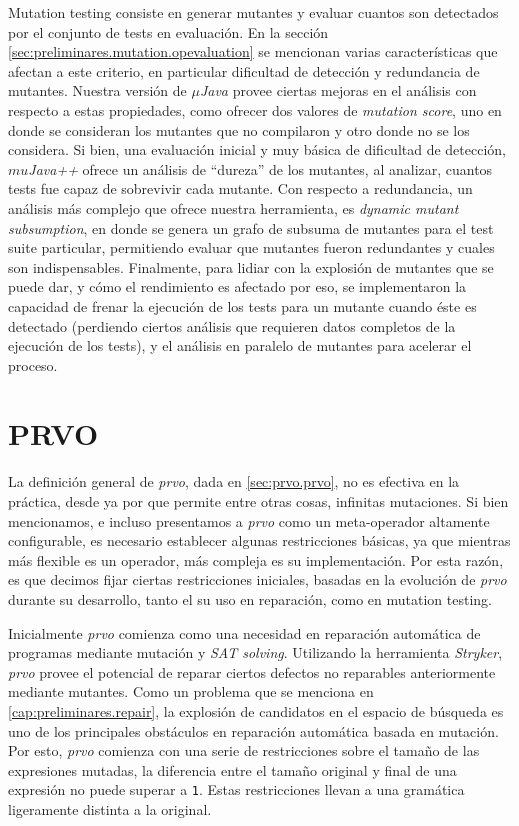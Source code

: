 Mutation testing consiste en generar mutantes y evaluar cuantos son detectados por el conjunto de tests en evaluaci\'on. En la secci\'on \ref{sec:preliminares.mutation.opevaluation} se mencionan varias caracter\'isticas que afectan a este criterio, en particular dificultad de detecci\'on y redundancia de mutantes. Nuestra versi\'on de \emph{$\mu$Java} provee ciertas mejoras en el an\'alisis con respecto a estas propiedades, como ofrecer dos valores de \emph{mutation score}, uno en donde se consideran los mutantes que no compilaron y otro donde no se los considera. Si bien, una evaluaci\'on inicial y muy b\'asica de dificultad de detecci\'on, \emph{$mu$Java++} ofrece un an\'alisis de ``dureza'' de los mutantes, al analizar, cuantos tests fue capaz de sobrevivir cada mutante. Con respecto a redundancia, un an\'alisis m\'as complejo que ofrece nuestra herramienta, es \emph{dynamic mutant subsumption}, en donde se genera un grafo de subsuma de mutantes para el test suite particular, permitiendo evaluar que mutantes fueron redundantes y cuales son indispensables. Finalmente, para lidiar con la explosi\'on de mutantes que se puede dar, y c\'omo el rendimiento es afectado por eso, se implementaron la capacidad de frenar la ejecuci\'on de los tests para un mutante cuando \'este es detectado (perdiendo ciertos an\'alisis que requieren datos completos de la ejecuci\'on de los tests), y el an\'alisis en paralelo de mutantes para acelerar el proceso.

\section{PRVO}
\label{sec:implementation.prvo}

La definici\'on general de \emph{prvo}, dada en \ref{sec:prvo.prvo}, no es efectiva en la pr\'actica, desde ya por que permite entre otras cosas, infinitas mutaciones. Si bien mencionamos, e incluso presentamos a \emph{prvo} como un meta-operador altamente configurable, es necesario establecer algunas restricciones b\'asicas, ya que mientras m\'as flexible es un operador, m\'as compleja es su implementaci\'on. Por esta raz\'on, es que decimos fijar ciertas restricciones iniciales, basadas en la evoluci\'on de \emph{prvo} durante su desarrollo, tanto el su uso en reparaci\'on, como en mutation testing.

Inicialmente \emph{prvo} comienza como una necesidad en reparaci\'on autom\'atica de programas mediante mutaci\'on y \emph{SAT solving}. Utilizando la herramienta \emph{Stryker}, \emph{prvo} provee el potencial de reparar ciertos defectos no reparables anteriormente mediante mutantes. Como un problema que se menciona en \ref{cap:preliminares.repair}, la explosi\'on de candidatos en el espacio de b\'usqueda es uno de los principales obst\'aculos en reparaci\'on autom\'atica basada en mutaci\'on. Por esto, \emph{prvo} comienza con una serie de restricciones sobre el tama\~no de las expresiones mutadas, la diferencia entre el tama\~no original y final de una expresi\'on no puede superar a \texttt{1}. Estas restricciones llevan a una gram\'atica ligeramente distinta a la original.

